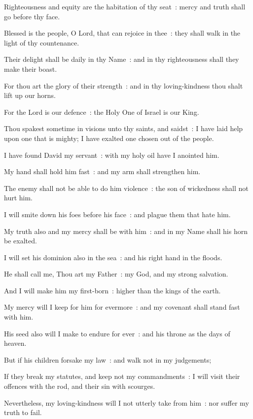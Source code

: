 Righteousness and equity are the habitation of thy seat~: mercy and truth shall go before thy face.\par
{}Blessed is the people, O Lord, that can rejoice in thee~: they shall walk in the light of thy countenance.\par
{}Their delight shall be daily in thy Name~: and in thy righteousness shall they make their boast.\par
{}For thou art the glory of their strength~: and in thy loving-kindness thou shalt lift up our horns.\par
{}For the Lord is our defence~: the Holy One of Israel is our King.\par
{}Thou spakest sometime in visions unto thy saints, and saidst~: I have laid help upon one that is mighty; I have exalted one chosen out of the people.\par
{}I have found David my servant~: with my holy oil have I anointed him.\par
{}My hand shall hold him fast~: and my arm shall strengthen him.\par
{}The enemy shall not be able to do him violence~: the son of wickedness shall not hurt him.\par
{}I will smite down his foes before his face~: and plague them that hate him.\par
{}My truth also and my mercy shall be with him~: and in my Name shall his horn be exalted.\par
{}I will set his dominion also in the sea~: and his right hand in the floods.\par
{}He shall call me, Thou art my Father~: my God, and my strong salvation.\par
{}And I will make him my first-born~: higher than the kings of the earth.\par
{}My mercy will I keep for him for evermore~: and my covenant shall stand fast with him.\par
{}His seed also will I make to endure for ever~: and his throne as the days of heaven.\par
{}But if his children forsake my law~: and walk not in my judgements;\par
{}If they break my statutes, and keep not my commandments~: I will visit their offences with the rod, and their sin with scourges.\par
{}Nevertheless, my loving-kindness will I not utterly take from him~: nor suffer my truth to fail.\par
